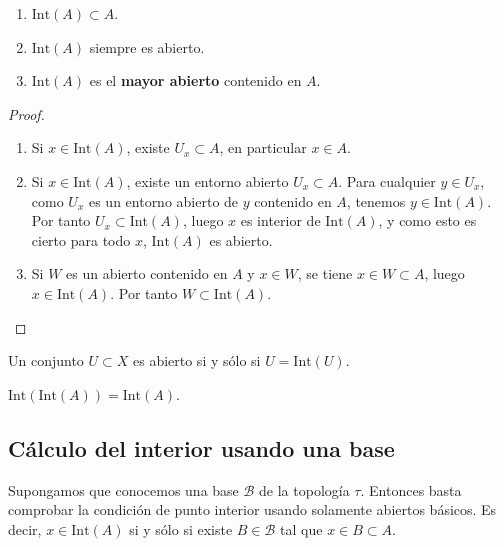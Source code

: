 \begin{proposición}
    \begin{enumerate}
        \item $\mathrm{Int}(A) \subset A$.
        \item $\mathrm{Int}(A)$ siempre es abierto.
        \item $\mathrm{Int}(A)$ es el \textbf{mayor abierto} contenido en $A$.
    \end{enumerate}
\end{proposición}
\begin{proof}
    \begin{enumerate}
        \item Si $x \in \mathrm{Int}(A)$, existe $U_x \subset A$, en particular $x \in A$.
        \item Si $x \in \mathrm{Int}(A)$, existe un entorno abierto $U_x \subset A$. Para cualquier $y \in U_x$, como $U_x$ es un entorno abierto de $y$ contenido en $A$, tenemos $y \in \mathrm{Int}(A)$. Por tanto $U_x \subset \mathrm{Int}(A)$, luego $x$ es interior de $\mathrm{Int}(A)$, y como esto es cierto para todo $x$, $\mathrm{Int}(A)$ es abierto.
        \item Si $W$ es un abierto contenido en $A$ y $x \in W$, se tiene $x \in W \subset A$, luego $x \in \mathrm{Int}(A)$. Por tanto $W \subset \mathrm{Int}(A)$.
    \end{enumerate}
\end{proof}

\begin{proposición}
    Un conjunto $U \subset X$ es abierto si y sólo si $U = \mathrm{Int}(U)$.
\end{proposición}

\begin{corolario}
    $\mathrm{Int}(\mathrm{Int}(A)) = \mathrm{Int}(A)$.
\end{corolario}

\subsection{Cálculo del interior usando una base}

\begin{proposición}
    Supongamos que conocemos una base $\mathcal{B}$ de la topología $\tau$. Entonces basta comprobar la condición de punto interior usando solamente abiertos básicos. Es decir, $x \in \mathrm{Int}(A)$ si y sólo si existe $B \in \mathcal{B}$ tal que $x \in B \subset A$.
\end{proposición}

